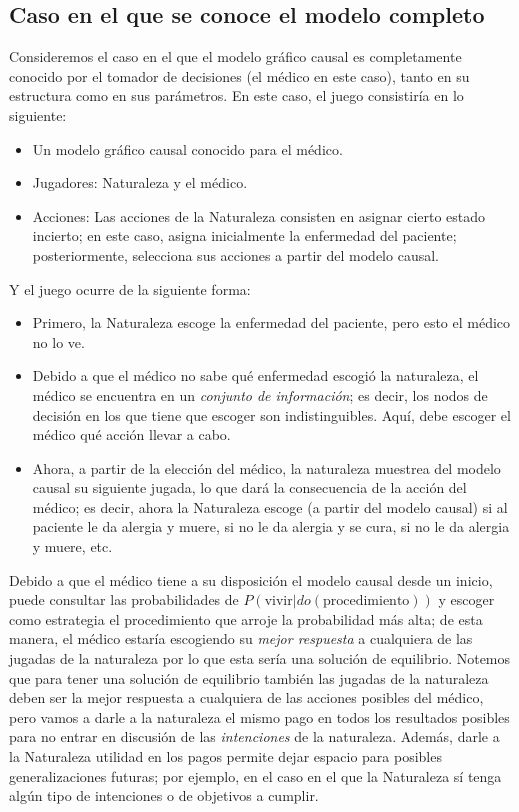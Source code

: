 \documentclass[11pt]{article}
\theoremstyle{plain}
\begin{document}
\subsection{Caso en el que se conoce el modelo completo}
Consideremos el caso en el que el modelo gráfico causal es completamente conocido por el tomador de decisiones (el médico en este caso), tanto en su estructura como en sus parámetros. En este caso, el juego consistiría en lo siguiente:\\
\begin{itemize}
\item Un modelo gráfico causal conocido para el médico.
\item Jugadores: Naturaleza y el médico.
\item Acciones: Las acciones de la Naturaleza consisten en asignar cierto estado incierto; en este caso, asigna inicialmente la enfermedad del paciente; posteriormente, selecciona sus acciones a partir del modelo causal.
\end{itemize}
Y el juego ocurre de la siguiente forma:
\begin{itemize}
\item Primero, la Naturaleza escoge la enfermedad del paciente, pero esto el médico no lo ve.
\item Debido a que el médico no sabe qué enfermedad escogió la naturaleza, el médico se encuentra en un \textit{conjunto de información}; es decir, los nodos de decisión en los que tiene que escoger son indistinguibles. Aquí, debe escoger el médico qué acción llevar a cabo. 
\item Ahora, a partir de la elección del médico, la naturaleza muestrea del modelo causal su siguiente jugada, lo que dará la consecuencia de la acción del médico; es decir, ahora la Naturaleza escoge (a partir del modelo causal) si al paciente le da alergia y muere, si no le da alergia y se cura, si no le da alergia y muere, etc.
\end{itemize}
Debido a que el médico tiene a su disposición el modelo causal desde un inicio, puede consultar las probabilidades de $P( \textrm{vivir} | do(\textrm{procedimiento}))$ y escoger como estrategia el procedimiento que arroje la probabilidad más alta; de esta manera, el médico estaría escogiendo su \textit{mejor respuesta} a cualquiera de las jugadas de la naturaleza por lo que esta sería una solución de equilibrio. Notemos que para tener una solución de equilibrio también las jugadas de la naturaleza deben ser la mejor respuesta a cualquiera de las acciones posibles del médico,  pero vamos a darle a la naturaleza el mismo pago en todos los resultados posibles para no entrar en discusión de las \textit{intenciones} de la naturaleza. Además, darle a la Naturaleza utilidad en los pagos permite dejar espacio para posibles generalizaciones futuras; por ejemplo, en el caso en el que la Naturaleza sí tenga algún tipo de intenciones o de objetivos a cumplir.
\end{document}
